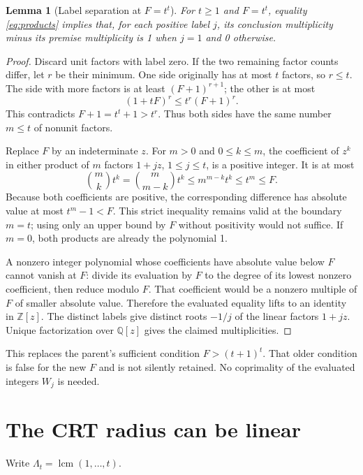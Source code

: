 \documentclass[11pt]{article}
\newtheorem{lemma}[theorem]{Lemma}
\begin{document}
\begin{lemma}[Label separation at $F=t^t$]\label{lem:labels}
For $t\ge1$ and $F=t^t$, equality \eqref{eq:products} implies that, for
each positive label $j$, its conclusion multiplicity minus its premise
multiplicity is 1 when $j=1$ and 0 otherwise.
\end{lemma}
\begin{proof}
Discard unit factors with label zero. If the two remaining factor counts
differ, let $r$ be their minimum. One side originally has at most $t$
factors, so $r\le t$. The side with more factors is at least
$(F+1)^{r+1}$; the other is at most
\[
 (1+tF)^r\le t^r(F+1)^r.
\]
This contradicts $F+1=t^t+1>t^r$. Thus both sides have the same number
$m\le t$ of nonunit factors.

Replace $F$ by an indeterminate $z$. For $m>0$ and $0\le k\le m$,
the coefficient of $z^k$ in either product of $m$ factors $1+jz$,
$1\le j\le t$, is a positive integer. It is at most
\[
 \binom{m}{k}t^k
 =\binom{m}{m-k}t^k
 \le m^{m-k}t^k\le t^m\le F.
\]
Because both coefficients are positive, the corresponding difference has
absolute value at most $t^m-1<F$. This strict inequality remains valid
at the boundary $m=t$; using only an upper bound by $F$ without positivity
would not suffice. If $m=0$, both products are already the polynomial 1.

A nonzero integer polynomial whose coefficients have absolute value below
$F$ cannot vanish at $F$: divide its evaluation by $F$ to the degree of
its lowest nonzero coefficient, then reduce modulo $F$. That coefficient
would be a nonzero multiple of $F$ of smaller absolute value. Therefore
the evaluated equality lifts to an identity in $\mathbb Z[z]$.
The distinct labels give distinct roots $-1/j$ of the linear factors
$1+jz$. Unique factorization over $\mathbb Q[z]$ gives the claimed
multiplicities.
\end{proof}

This replaces the parent's sufficient condition $F>(t+1)^t$. That older
condition is false for the new $F$ and is not silently retained. No
coprimality of the evaluated integers $W_j$ is needed.

\section{The CRT radius can be linear}\label{sec:radius}

Write $\Lambda_t=\operatorname{lcm}(1,\ldots,t)$.
\end{document}
